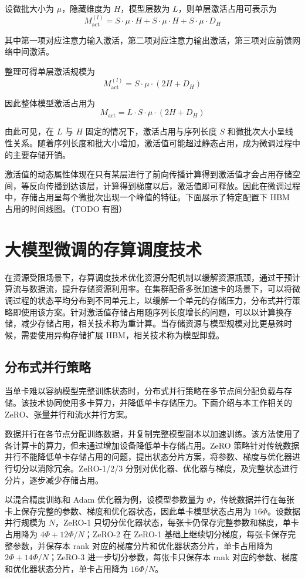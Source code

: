 \documentclass[bachelor,openany,oneside,color,AutoFakeBold=true]{buaathesis}
\begin{document}
设微批大小为 ${\mu}$，隐藏维度为 $H$，模型层数为 $L$，则单层激活占用可表示为
\[
M_{\mathrm{act}}^{(l)} = S \cdot \mu \cdot H + S \cdot \mu \cdot H + S \cdot \mu \cdot D_H
\]

其中第一项对应注意力输入激活，第二项对应注意力输出激活，第三项对应前馈网络中间激活。

整理可得单层激活规模为
\[
M_{\mathrm{act}}^{(l)} = S \cdot \mu \cdot (2H + D_H)
\]

因此整体模型激活占用为
\[
M_{\mathrm{act}} = L \cdot S \cdot \mu \cdot (2H + D_H)
\]

由此可见，在 $L$ 与 $H$ 固定的情况下，激活占用与序列长度 $S$ 和微批次大小呈线性关系。随着序列长度和批大小增加，激活值可能超过静态占用，成为微调过程中的主要存储开销。

激活值的动态属性体现在只有某层进行了前向传播计算得到激活值才会占用存储空间，等反向传播到达该层，计算得到梯度以后，激活值即可释放。因此在微调过程中，存储占用呈每个微批次出现一个峰值的特征。下面展示了特定配置下 HBM 占用的时间线图。（TODO 有图）

\section{大模型微调的存算调度技术}

在资源受限场景下，存算调度技术优化资源分配机制以缓解资源瓶颈，通过干预计算流与数据流，提升存储资源利用率。在集群配备多张加速卡的场景下，可以将微调过程的状态平均分布到不同单元上，以缓解一个单元的存储压力，分布式并行策略即使用该方案。针对激活值存储占用随序列长度增长的问题，可以以计算换存储，减少存储占用，相关技术称为重计算。当存储资源与模型规模对比更悬殊时候，需要使用异构存储扩展 HBM，相关技术称为模型卸载。

\subsection{分布式并行策略}

当单卡难以容纳模型完整训练状态时，分布式并行策略在多节点间分配负载与存储。该技术协同使用多卡算力，并降低单卡存储压力。下面介绍与本工作相关的 ZeRO、张量并行和流水并行方案。

数据并行在各节点分配训练数据，并复制完整模型副本以加速训练。该方法使用了各计算卡的算力，但未通过增加设备降低单卡存储占用。ZeRO 策略针对传统数据并行不能降低单卡存储占用的问题，提出状态分片方案，将参数、梯度与优化器进行切分以消除冗余。ZeRO-1/2/3 分别对优化器、优化器与梯度，及完整状态进行分片，逐步减少存储占用。

以混合精度训练和 Adam 优化器为例，设模型参数量为 $\Phi$，传统数据并行在每张卡上保存完整的参数、梯度和优化器状态，因此单卡模型状态占用为 $16\Phi$。设数据并行规模为 $N$，ZeRO-1 只切分优化器状态，每张卡仍保存完整参数和梯度，单卡占用降为 $4\Phi+12\Phi/N$；ZeRO-2 在 ZeRO-1 基础上继续切分梯度，每张卡保存完整参数，并保存本 rank 对应的梯度分片和优化器状态分片，单卡占用降为 $2\Phi+14\Phi/N$；ZeRO-3 进一步切分参数，每张卡只保存本 rank 对应的参数、梯度和优化器状态分片，单卡占用降为 $16\Phi/N$。
\end{document}
